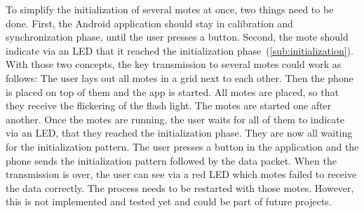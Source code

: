 \documentclass{sig-alternate} %
\begin{document}
To simplify the initialization of several motes at once, two things need to be done.
First, the Android application should stay in calibration and synchronization phase, until the user presses a button.
Second, the mote should indicate via an LED that it reached the initialization phase~(\ref{sub:initialization}).
With those two concepts, the key transmission to several motes could work as follows:
The user lays out all motes in a grid next to each other.
Then the phone is placed on top of them and the app is started.
All motes are placed, so that they receive the flickering of the flash light.
The motes are started one after another.
Once the motes are running, the user waits for all of them to indicate via an LED, that they reached the initialization phase.
They are now all waiting for the initialization pattern.
The user presses a button in the application and the phone sends the initialization pattern followed by the data packet.
When the transmission is over, the user can see via a red LED which motes failed to receive the data correctly.
The process needs to be restarted with those motes.
However, this is not implemented and tested yet and could be part of future projects.



\end{document}
